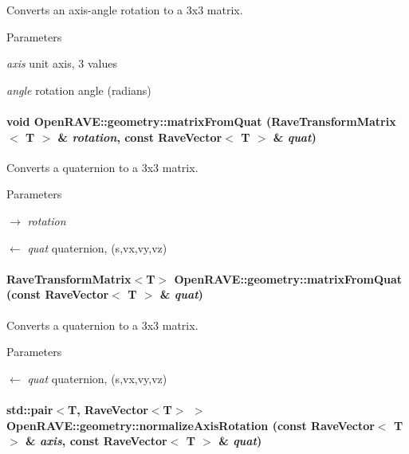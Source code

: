 Converts an axis-\/angle rotation to a 3x3 matrix. 


\begin{DoxyParams}{Parameters}
\item[{\em axis}]unit axis, 3 values \item[{\em angle}]rotation angle (radians) \end{DoxyParams}
\hypertarget{group__affine__math_gacf10676c714b228545f93be252163d76}{
\paragraph[{matrixFromQuat}]{\setlength{\rightskip}{0pt plus 5cm}void OpenRAVE::geometry::matrixFromQuat (RaveTransformMatrix$<$ T $>$ \& {\em rotation}, \/  const RaveVector$<$ T $>$ \& {\em quat})}\hfill}
\label{group__affine__math_gacf10676c714b228545f93be252163d76}


Converts a quaternion to a 3x3 matrix. 


\begin{DoxyParams}{Parameters}
\item[\mbox{$\rightarrow$} {\em rotation}]\item[\mbox{$\leftarrow$} {\em quat}]quaternion, (s,vx,vy,vz) \end{DoxyParams}
\hypertarget{group__affine__math_gadee9ddfd3bb8c56e599cf252853ff144}{
\paragraph[{matrixFromQuat}]{\setlength{\rightskip}{0pt plus 5cm}RaveTransformMatrix$<$T$>$ OpenRAVE::geometry::matrixFromQuat (const RaveVector$<$ T $>$ \& {\em quat})}\hfill}
\label{group__affine__math_gadee9ddfd3bb8c56e599cf252853ff144}


Converts a quaternion to a 3x3 matrix. 


\begin{DoxyParams}{Parameters}
\item[\mbox{$\leftarrow$} {\em quat}]quaternion, (s,vx,vy,vz) \end{DoxyParams}
\hypertarget{group__affine__math_ga436efaa950bb38f3b3b8a891e5da5591}{
\paragraph[{normalizeAxisRotation}]{\setlength{\rightskip}{0pt plus 5cm}std::pair$<$T, RaveVector$<$T$>$ $>$ OpenRAVE::geometry::normalizeAxisRotation (const RaveVector$<$ T $>$ \& {\em axis}, \/  const RaveVector$<$ T $>$ \& {\em quat})}\hfill}
\label{group__affine__math_ga436efaa950bb38f3b3b8a891e5da5591}


